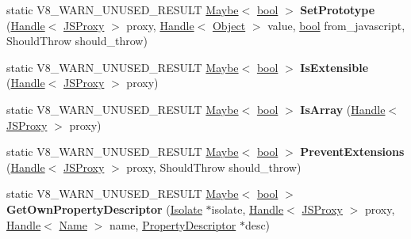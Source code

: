\begin{DoxyCompactItemize}
static V8\+\_\+\+W\+A\+R\+N\+\_\+\+U\+N\+U\+S\+E\+D\+\_\+\+R\+E\+S\+U\+LT \mbox{\hyperlink{classv8_1_1Maybe}{Maybe}}$<$ \mbox{\hyperlink{classbool}{bool}} $>$ {\bfseries Set\+Prototype} (\mbox{\hyperlink{classv8_1_1internal_1_1Handle}{Handle}}$<$ \mbox{\hyperlink{classv8_1_1internal_1_1JSProxy}{J\+S\+Proxy}} $>$ proxy, \mbox{\hyperlink{classv8_1_1internal_1_1Handle}{Handle}}$<$ \mbox{\hyperlink{classv8_1_1internal_1_1Object}{Object}} $>$ value, \mbox{\hyperlink{classbool}{bool}} from\+\_\+javascript, Should\+Throw should\+\_\+throw)
\item 
\mbox{\label{classv8_1_1internal_1_1JSProxy_a38d36cf93f0f09eac5f79a6019c7870a}} 
static V8\+\_\+\+W\+A\+R\+N\+\_\+\+U\+N\+U\+S\+E\+D\+\_\+\+R\+E\+S\+U\+LT \mbox{\hyperlink{classv8_1_1Maybe}{Maybe}}$<$ \mbox{\hyperlink{classbool}{bool}} $>$ {\bfseries Is\+Extensible} (\mbox{\hyperlink{classv8_1_1internal_1_1Handle}{Handle}}$<$ \mbox{\hyperlink{classv8_1_1internal_1_1JSProxy}{J\+S\+Proxy}} $>$ proxy)
\item 
\mbox{\label{classv8_1_1internal_1_1JSProxy_ad1f2d53a29eb26459d457dec3f25004b}} 
static V8\+\_\+\+W\+A\+R\+N\+\_\+\+U\+N\+U\+S\+E\+D\+\_\+\+R\+E\+S\+U\+LT \mbox{\hyperlink{classv8_1_1Maybe}{Maybe}}$<$ \mbox{\hyperlink{classbool}{bool}} $>$ {\bfseries Is\+Array} (\mbox{\hyperlink{classv8_1_1internal_1_1Handle}{Handle}}$<$ \mbox{\hyperlink{classv8_1_1internal_1_1JSProxy}{J\+S\+Proxy}} $>$ proxy)
\item 
\mbox{\label{classv8_1_1internal_1_1JSProxy_a547bb2191c7f7c392b30871d96ca1f53}} 
static V8\+\_\+\+W\+A\+R\+N\+\_\+\+U\+N\+U\+S\+E\+D\+\_\+\+R\+E\+S\+U\+LT \mbox{\hyperlink{classv8_1_1Maybe}{Maybe}}$<$ \mbox{\hyperlink{classbool}{bool}} $>$ {\bfseries Prevent\+Extensions} (\mbox{\hyperlink{classv8_1_1internal_1_1Handle}{Handle}}$<$ \mbox{\hyperlink{classv8_1_1internal_1_1JSProxy}{J\+S\+Proxy}} $>$ proxy, Should\+Throw should\+\_\+throw)
\item 
\mbox{\label{classv8_1_1internal_1_1JSProxy_a3edc8262a2c693d07df1ee36949cb163}} 
static V8\+\_\+\+W\+A\+R\+N\+\_\+\+U\+N\+U\+S\+E\+D\+\_\+\+R\+E\+S\+U\+LT \mbox{\hyperlink{classv8_1_1Maybe}{Maybe}}$<$ \mbox{\hyperlink{classbool}{bool}} $>$ {\bfseries Get\+Own\+Property\+Descriptor} (\mbox{\hyperlink{classv8_1_1internal_1_1Isolate}{Isolate}} $\ast$isolate, \mbox{\hyperlink{classv8_1_1internal_1_1Handle}{Handle}}$<$ \mbox{\hyperlink{classv8_1_1internal_1_1JSProxy}{J\+S\+Proxy}} $>$ proxy, \mbox{\hyperlink{classv8_1_1internal_1_1Handle}{Handle}}$<$ \mbox{\hyperlink{classv8_1_1internal_1_1Name}{Name}} $>$ name, \mbox{\hyperlink{classv8_1_1internal_1_1PropertyDescriptor}{Property\+Descriptor}} $\ast$desc)

\end{DoxyCompactItemize}
